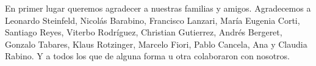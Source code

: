 
\begin{acknowledgments}

En primer lugar queremos agradecer a nuestras familias y amigos. Agradecemos a Leonardo Steinfeld, Nicolás Barabino, Francisco Lanzari, María Eugenia Corti, Santiago Reyes, Viterbo Rodríguez, Christian Gutierrez, Andrés Bergeret, Gonzalo Tabares, Klaus Rotzinger, Marcelo Fiori, Pablo Cancela, Ana y Claudia Rabino. Y a todos los que de alguna forma u otra colaboraron con nosotros.

\end{acknowledgments}